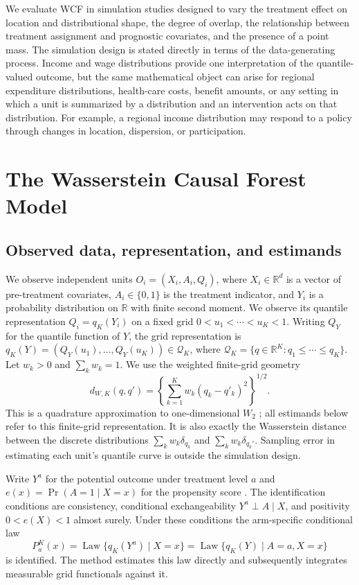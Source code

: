 \documentclass[11pt]{article}
\begin{document}
We evaluate WCF in simulation studies designed to vary the treatment effect on location and distributional shape, the degree of overlap, the relationship between treatment assignment and prognostic covariates, and the presence of a point mass. The simulation design is stated directly in terms of the data-generating process. Income and wage distributions provide one interpretation of the quantile-valued outcome, but the same mathematical object can arise for regional expenditure distributions, health-care costs, benefit amounts, or any setting in which a unit is summarized by a distribution and an intervention acts on that distribution. For example, a regional income distribution may respond to a policy through changes in location, dispersion, or participation.

\section{The Wasserstein Causal Forest Model}\label{sec:model}

\subsection{Observed data, representation, and estimands}\label{sec:setup}

We observe independent units $O_i=(X_i,A_i,Q_i)$, where $X_i\in
\mathbb{R}^{d}$ is a vector of pre-treatment covariates, $A_i\in\{0,1\}$ is
the treatment indicator, and $Y_i$ is a probability distribution on $\mathbb{R}$ with finite second moment. We observe its quantile representation $Q_i=q_K(Y_i)$ on a
fixed grid $0<u_1<\cdots<u_K<1$. Writing $Q_Y$ for the quantile function of $Y$, the grid representation is
$q_K(Y)=(Q_Y(u_1),\ldots,Q_Y(u_K))\in\mathcal{Q}_K$, where
$\mathcal{Q}_K=\{q\in\mathbb{R}^K:q_1\leq\cdots\leq q_K\}$. Let
$w_k>0$ and $\sum_k w_k=1$. We use the weighted finite-grid geometry
\[
 d_{W,K}(q,q')=\left\{\sum_{k=1}^{K}w_k(q_k-q'_k)^2\right\}^{1/2}.
\]
This is a quadrature approximation to one-dimensional $W_2$
\citep{peyre2019optimaltransport}; all
estimands below refer to this finite-grid representation. It is also exactly the Wasserstein distance between the discrete distributions $\sum_k w_k\delta_{q_k}$ and $\sum_k w_k\delta_{q_k'}$. Sampling error in estimating each unit's quantile curve is outside the simulation design.

Write $Y^a$ for the potential outcome under treatment level $a$ and
$e(x)=\Pr(A=1\mid X=x)$ for the propensity score \citep{rosenbaum1983propensity}. The identification
conditions are consistency, conditional exchangeability
$Y^a\perp A\mid X$, and positivity $0<e(X)<1$ almost surely. Under these
conditions the arm-specific conditional law
\[
 P_a^K(x)=\operatorname{Law}\{q_K(Y^a)\mid X=x\}
 =\operatorname{Law}\{q_K(Y)\mid A=a,X=x\}
\]
is identified. The method estimates this law directly and subsequently
integrates measurable grid functionals against it.
\end{document}
